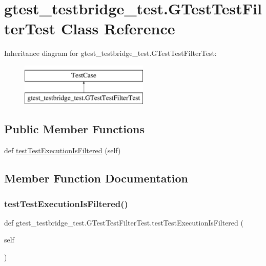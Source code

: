 \hypertarget{classgtest__testbridge__test_1_1GTestTestFilterTest}{}\section{gtest\+\_\+testbridge\+\_\+test.\+G\+Test\+Test\+Filter\+Test Class Reference}
\label{classgtest__testbridge__test_1_1GTestTestFilterTest}
Inheritance diagram for gtest\+\_\+testbridge\+\_\+test.\+G\+Test\+Test\+Filter\+Test\+:\begin{figure}[H]
\begin{center}
\leavevmode
\includegraphics[height=2.000000cm]{classgtest__testbridge__test_1_1GTestTestFilterTest}
\end{center}
\end{figure}
\subsection*{Public Member Functions}
\begin{DoxyCompactItemize}
\item 
def \mbox{\hyperlink{classgtest__testbridge__test_1_1GTestTestFilterTest_af41ae1fea4ec08f5594ad1ae78663d3c}{test\+Test\+Execution\+Is\+Filtered}} (self)
\end{DoxyCompactItemize}


\subsection{Member Function Documentation}
\mbox{\label{classgtest__testbridge__test_1_1GTestTestFilterTest_af41ae1fea4ec08f5594ad1ae78663d3c}} 
\subsubsection{\texorpdfstring{testTestExecutionIsFiltered()}{testTestExecutionIsFiltered()}}
{\footnotesize\ttfamily def gtest\+\_\+testbridge\+\_\+test.\+G\+Test\+Test\+Filter\+Test.\+test\+Test\+Execution\+Is\+Filtered (\begin{DoxyParamCaption}\item[{}]{self }\end{DoxyParamCaption})}

